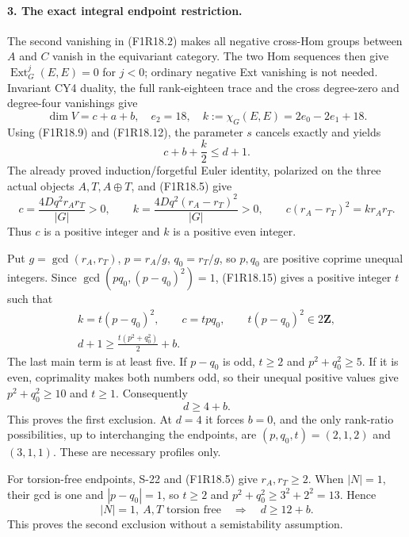 \paragraph{3. The exact integral endpoint restriction.}
The second vanishing in (F1R18.2) makes all negative
cross-Hom groups between $A$ and $C$ vanish in the
equivariant category. The two Hom sequences then give
$\operatorname{Ext}^j_G(E,E)=0$ for $j<0$; ordinary
negative Ext vanishing is not needed. Invariant CY4
duality, the full rank-eighteen trace and the cross
degree-zero and degree-four vanishings give
\[
 \dim V=c+a+b,\quad e_2=18,\quad
 k:=\chi_G(E,E)=2e_0-2e_1+18.
 \tag{F1R18.13}
\]
Using (F1R18.9) and (F1R18.12), the parameter $s$
cancels exactly and yields
\[
                            c+b+\frac{k}{2}\le d+1.
 \tag{F1R18.14}
\]
The already proved induction/forgetful Euler identity,
polarized on the three actual objects $A,T,A\oplus T$,
and (F1R18.5) give
\[
 c=\frac{4Dq^2r_A r_T}{|G|}>0,
 \qquad k=\frac{4Dq^2(r_A-r_T)^2}{|G|}>0,
 \qquad c(r_A-r_T)^2=k r_A r_T.
 \tag{F1R18.15}
\]
Thus $c$ is a positive integer and $k$ is a positive
even integer.

Put $g=\gcd(r_A,r_T)$, $p=r_A/g$, $q_0=r_T/g$,
so $p,q_0$ are positive coprime unequal integers.
Since $\gcd(pq_0,(p-q_0)^2)=1$, (F1R18.15) gives
a positive integer $t$ such that
\[
 \begin{gathered}
 k=t(p-q_0)^2,\qquad c=tpq_0,\qquad t(p-q_0)^2\in2\mathbf Z,\\
                    d+1\ge\frac{t(p^2+q_0^2)}2+b.
 \end{gathered}
 \tag{F1R18.16}
\]
The last main term is at least five. If $p-q_0$ is
odd, $t\ge2$ and $p^2+q_0^2\ge5$. If it is even,
coprimality makes both numbers odd, so their unequal
positive values give $p^2+q_0^2\ge10$ and $t\ge1$.
Consequently
\[
                                  d\ge4+b.
 \tag{F1R18.17}
\]
This proves the first exclusion. At $d=4$ it forces
$b=0$, and the only rank-ratio possibilities, up to
interchanging the endpoints, are $(p,q_0,t)=(2,1,2)$
and $(3,1,1)$. These are necessary profiles only.

For torsion-free endpoints, S-22 and (F1R18.5) give
$r_A,r_T\ge2$. When $|N|=1$, their gcd is one and
$|p-q_0|=1$, so $t\ge2$ and
$p^2+q_0^2\ge3^2+2^2=13$. Hence
\[
                  |N|=1,\ A,T\text{ torsion free}
                  \quad\Longrightarrow\quad d\ge12+b.
 \tag{F1R18.18}
\]
This proves the second exclusion without a semistability
assumption.

